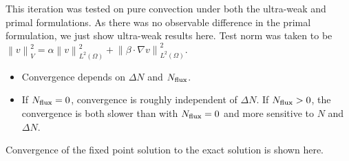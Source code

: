 \documentclass{article}
\newcommand{\grad}{\nabla}
\newcommand{\nor}[1]{\left\| #1 \right\|}
\newcommand{\LRp}[1]{\left( #1 \right)}
\renewcommand{\L}{L^2\LRp{\Omega}}
\begin{document}
This iteration was tested on pure convection under both the ultra-weak and primal formulations.  As there was no observable difference in the primal formulation, we just show ultra-weak results here.  Test norm was taken to be $\nor{v}_V^2 = \alpha\nor{v}_{\L}^2 + \nor{\beta\cdot\grad v}_{\L}^2$.  
\begin{itemize}
\item Convergence depends on $\Delta N$ and $N_{\rm flux}$.  
\item If $N_{\rm flux} = 0$, convergence is roughly independent of $\Delta N$.  If $N_{\rm flux} > 0$, the convergence is both slower than with $N_{\rm flux} = 0$ and more sensitive to $N$ and $\Delta N$.
\end{itemize}

Convergence of the fixed point solution to the exact solution is shown here.
\end{document}
